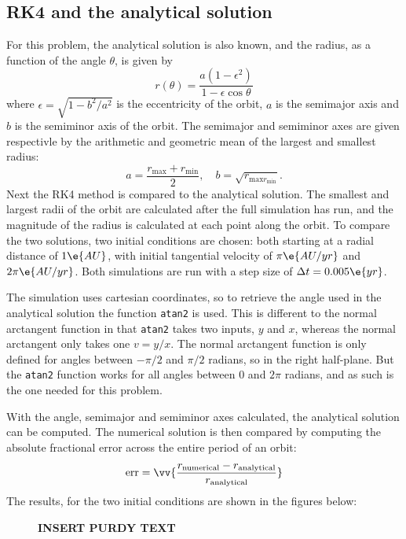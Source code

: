 \documentclass[a4paper,10pt]{article} 	%
\numberwithin{equation}{section}
\begin{document}
	\subsection{RK4 and the analytical solution}
	For this problem, the analytical solution is also known, and the radius, as a function of the angle $ \theta $, is given by
	\begin{equation}
		r(\theta) = \frac{a(1-\epsilon^2)}{1-\epsilon \cos \theta}
	\end{equation}
	where $ \epsilon = \sqrt{1-b^2/a^2}$ is the eccentricity of the orbit, $ a $ is the semimajor axis and $ b $ is the semiminor axis of the orbit. The semimajor and semiminor axes are given respectivle by the arithmetic and geometric mean of the largest and smallest radius:
	\begin{equation}
		a = \frac{r_{\text{max}}+r_{\text{min}}}{2}, \quad b = \sqrt{r_{\text{max}r_{\text{min}}}}.
	\end{equation}
	Next the RK4 method is compared to the analytical solution. The smallest and largest radii of the orbit are calculated after the full simulation has run, and the magnitude of the radius is calculated at each point along the orbit. To compare the two solutions, two initial conditions are chosen: both starting at a radial distance of $ 1 \e{AU} $, with initial tangential velocity of $ \pi \e{AU/yr} $ and $ 2 \pi \e{AU/yr} $. Both simulations are run with a step size of $ \Delta t  = 0.005 \e{yr} $.
	
	The simulation uses cartesian coordinates, so to retrieve the angle used in the analytical solution the function \texttt{atan2} is used. This is different to the normal arctangent function in that \texttt{atan2} takes two inputs, $ y $ and $ x $, whereas the normal arctangent only takes one $ v = y/x $. The normal arctangent function is only defined for angles between $ -\pi/2 $ and $ \pi/2 $ radians, so in the right half-plane. But the \texttt{atan2} function works for all angles between $ 0 $ and $ 2\pi $ radians, and as such is the one needed for this problem.
	
	With the angle, semimajor and semiminor axes calculated, the analytical solution can be computed. The numerical solution is then compared by computing the absolute fractional error across the entire period of an orbit:
	\begin{equation}
		\text{err} = \vv{\frac{r_{\text{numerical}}-r_{\text{analytical}}}{r_{\text{analytical}}}}
	\end{equation}
	The results, for the two initial conditions are shown in the figures below:
	\begin{figure}[H]
		\centering
		\caption{\textbf{INSERT PURDY TEXT}}
		\label{fig:KeplerAnalytical}
	\end{figure}
\end{document}
